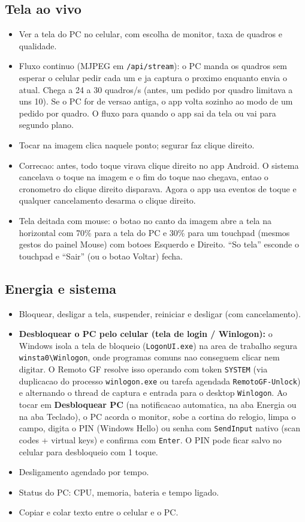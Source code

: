 \documentclass[11pt,a4paper]{article}
\begin{document}
\subsection{Tela ao vivo}
\begin{itemize}
  \item Ver a tela do PC no celular, com escolha de monitor, taxa de quadros e qualidade.
  \item Fluxo continuo (MJPEG em \texttt{/api/stream}): o PC manda os quadros sem esperar o
  celular pedir cada um e ja captura o proximo enquanto envia o atual. Chega a 24 a 30
  quadros/s (antes, um pedido por quadro limitava a uns 10). Se o PC for de versao antiga, o
  app volta sozinho ao modo de um pedido por quadro. O fluxo para quando o app sai da tela ou
  vai para segundo plano.
  \item Tocar na imagem clica naquele ponto; segurar faz clique direito.
  \item Correcao: antes, todo toque virava clique direito no app Android. O sistema
  cancelava o toque na imagem e o fim do toque nao chegava, entao o cronometro do clique
  direito disparava. Agora o app usa eventos de toque e qualquer cancelamento desarma o
  clique direito.
  \item Tela deitada com mouse: o botao no canto da imagem abre a tela na horizontal com
  70\% para a tela do PC e 30\% para um touchpad (mesmos gestos do painel Mouse) com botoes
  Esquerdo e Direito. ``So tela'' esconde o touchpad e ``Sair'' (ou o botao Voltar) fecha.
\end{itemize}

\subsection{Energia e sistema}
\begin{itemize}
  \item Bloquear, desligar a tela, suspender, reiniciar e desligar (com cancelamento).
  \item \textbf{Desbloquear o PC pelo celular (tela de login / Winlogon):} o Windows isola a
  tela de bloqueio (\texttt{LogonUI.exe}) na area de trabalho segura \texttt{winsta0\textbackslash Winlogon},
  onde programas comuns nao conseguem clicar nem digitar. O Remoto GF resolve isso operando com
  token \texttt{SYSTEM} (via duplicacao do processo \texttt{winlogon.exe} ou tarefa agendada
  \texttt{RemotoGF-Unlock}) e alternando o thread de captura e entrada para o desktop
  \texttt{Winlogon}. Ao tocar em \textbf{Desbloquear PC} (na notificacao automatica, na aba
  Energia ou na aba Teclado), o PC acorda o monitor, sobe a cortina do relogio, limpa o campo,
  digita o PIN (Windows Hello) ou senha com \texttt{SendInput} nativo (scan codes + virtual keys)
  e confirma com \texttt{Enter}. O PIN pode ficar salvo no celular para desbloqueio com 1 toque.
  \item Desligamento agendado por tempo.
  \item Status do PC: CPU, memoria, bateria e tempo ligado.
  \item Copiar e colar texto entre o celular e o PC.
\end{itemize}
\end{document}
